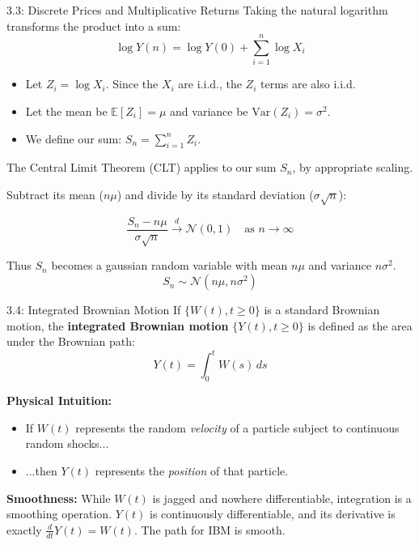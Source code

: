 \documentclass{beamer}
\begin{document}
	\begin{frame}{3.3: Discrete Prices and Multiplicative Returns}
		Taking the natural logarithm transforms the product into a sum:
		$$\log Y(n) = \log Y(0) + \sum_{i=1}^n \log X_i$$
		
		\begin{itemize}
			\item Let $Z_i = \log X_i$. Since the $X_i$ are i.i.d., the $Z_i$ terms are also i.i.d.
			\item Let the mean be $\mathbb{E}[Z_i] = \mu$ and variance be $\text{Var}(Z_i) = \sigma^2$.
			\item We define our sum: $S_n = \sum_{i=1}^n Z_i$.
		\end{itemize}
		
		The Central Limit Theorem (CLT) applies to our sum $S_n$, by appropriate scaling.
		
		Subtract its mean ($n\mu$) and divide by its standard deviation ($\sigma\sqrt{n}$):
		
		\begin{equation*}
			\frac{S_n - n\mu}{\sigma \sqrt{n}} \xrightarrow{d} \mathcal{N}(0, 1) \quad \text{as } n \to \infty
		\end{equation*}
		
		Thus $S_n$ becomes a gaussian random variable with mean $n\mu$ and variance $n\sigma^2$.
		$$S_n \sim \mathcal{N}(n\mu, n\sigma^2)$$
	\end{frame}

	\begin{frame}{3.4: Integrated Brownian Motion}
		If $\{W(t), t \ge 0\}$ is a standard Brownian motion, the \textbf{integrated Brownian motion} $\{Y(t), t \ge 0\}$ is defined as the area under the Brownian path:
		$$Y(t) = \int_0^t W(s) \, ds$$
		
		\textbf{Physical Intuition:}
		\begin{itemize}
			\item If $W(t)$ represents the random \textit{velocity} of a particle subject to continuous random shocks...
			\item ...then $Y(t)$ represents the \textit{position} of that particle.
		\end{itemize}
		
		\textbf{Smoothness:} While $W(t)$ is jagged and nowhere differentiable, integration is a smoothing operation. $Y(t)$ is continuously differentiable, and its derivative is exactly $\frac{d}{dt}Y(t) = W(t)$. The path for IBM is smooth.
	\end{frame}
	
\end{document}
